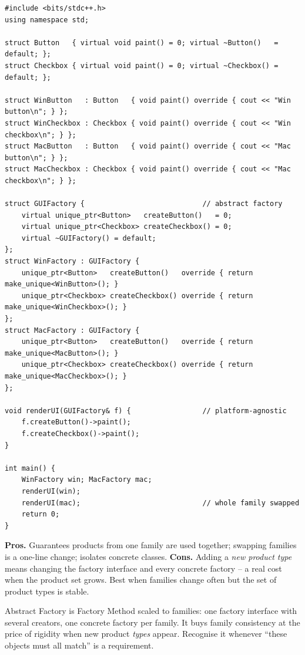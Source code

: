 \begin{lstlisting}
#include <bits/stdc++.h>
using namespace std;

struct Button   { virtual void paint() = 0; virtual ~Button()   = default; };
struct Checkbox { virtual void paint() = 0; virtual ~Checkbox() = default; };

struct WinButton   : Button   { void paint() override { cout << "Win button\n"; } };
struct WinCheckbox : Checkbox { void paint() override { cout << "Win checkbox\n"; } };
struct MacButton   : Button   { void paint() override { cout << "Mac button\n"; } };
struct MacCheckbox : Checkbox { void paint() override { cout << "Mac checkbox\n"; } };

struct GUIFactory {                            // abstract factory
    virtual unique_ptr<Button>   createButton()   = 0;
    virtual unique_ptr<Checkbox> createCheckbox() = 0;
    virtual ~GUIFactory() = default;
};
struct WinFactory : GUIFactory {
    unique_ptr<Button>   createButton()   override { return make_unique<WinButton>(); }
    unique_ptr<Checkbox> createCheckbox() override { return make_unique<WinCheckbox>(); }
};
struct MacFactory : GUIFactory {
    unique_ptr<Button>   createButton()   override { return make_unique<MacButton>(); }
    unique_ptr<Checkbox> createCheckbox() override { return make_unique<MacCheckbox>(); }
};

void renderUI(GUIFactory& f) {                 // platform-agnostic
    f.createButton()->paint();
    f.createCheckbox()->paint();
}

int main() {
    WinFactory win; MacFactory mac;
    renderUI(win);
    renderUI(mac);                             // whole family swapped
    return 0;
}
\end{lstlisting}

\begin{complexitybox}
\textbf{Pros.} Guarantees products from one family are used together;
swapping families is a one-line change; isolates concrete classes.
\textbf{Cons.} Adding a \emph{new product type} means changing the factory
interface and every concrete factory -- a real cost when the product set
grows. Best when families change often but the set of product types is
stable.
\end{complexitybox}

\begin{takeawaybox}
Abstract Factory is Factory Method scaled to families: one factory
interface with several creators, one concrete factory per family. It buys
family consistency at the price of rigidity when new product \emph{types}
appear. Recognise it whenever ``these objects must all match'' is a
requirement.
\end{takeawaybox}
